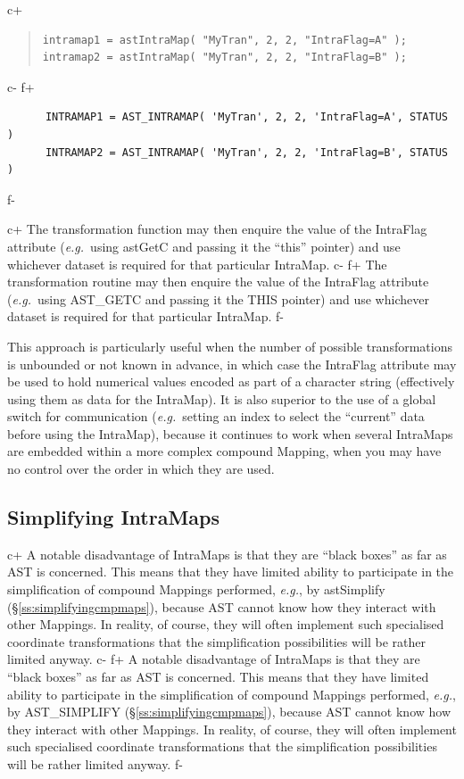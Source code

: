 \documentclass[twoside,11pt]{article}
\newcommand{\xlabel}[1]{}
\newcommand{\secref}[1]{\S\ref{#1}}
\newcommand{\secref}[1]{\ref{#1}}
\begin{document}
c+
\begin{quote}
\small
\begin{verbatim}
intramap1 = astIntraMap( "MyTran", 2, 2, "IntraFlag=A" );
intramap2 = astIntraMap( "MyTran", 2, 2, "IntraFlag=B" );
\end{verbatim}
\normalsize
\end{quote}
c-
f+
\small
\begin{verbatim}
      INTRAMAP1 = AST_INTRAMAP( 'MyTran', 2, 2, 'IntraFlag=A', STATUS )
      INTRAMAP2 = AST_INTRAMAP( 'MyTran', 2, 2, 'IntraFlag=B', STATUS )
\end{verbatim}
\normalsize
f-

c+
The transformation function may then enquire the value of the IntraFlag
attribute ({\em{e.g.}}\ using astGetC and passing it the ``this''
pointer) and use whichever dataset is required for that particular
IntraMap.
c-
f+
The transformation routine may then enquire the value of the IntraFlag
attribute ({\em{e.g.}}\ using AST\_GETC and passing it the THIS
pointer) and use whichever dataset is required for that particular
IntraMap.
f-

This approach is particularly useful when the number of possible
transformations is unbounded or not known in advance, in which case
the IntraFlag attribute may be used to hold numerical values encoded
as part of a character string (effectively using them as data for the
IntraMap). It is also superior to the use of a global switch for
communication ({\em{e.g.}}\ setting an index to select the ``current''
data before using the IntraMap), because it continues to work when
several IntraMaps are embedded within a more complex compound Mapping,
when you may have no control over the order in which they are used.

\subsection{\xlabel{MaxTran}\label{ss:simplifyingintramaps}Simplifying IntraMaps}

c+
A notable disadvantage of IntraMaps is that they are ``black boxes''
as far as AST is concerned. This means that they have limited ability
to participate in the simplification of compound Mappings performed,
{\em{e.g.}}, by astSimplify (\secref{ss:simplifyingcmpmaps}), because
AST cannot know how they interact with other Mappings. In reality, of
course, they will often implement such specialised coordinate
transformations that the simplification possibilities will be rather
limited anyway.
c-
f+
A notable disadvantage of IntraMaps is that they are ``black boxes''
as far as AST is concerned. This means that they have limited ability
to participate in the simplification of compound Mappings performed,
{\em{e.g.}}, by AST\_SIMPLIFY (\secref{ss:simplifyingcmpmaps}),
because AST cannot know how they interact with other Mappings. In
reality, of course, they will often implement such specialised
coordinate transformations that the simplification possibilities will
be rather limited anyway.
f-
\end{document}

